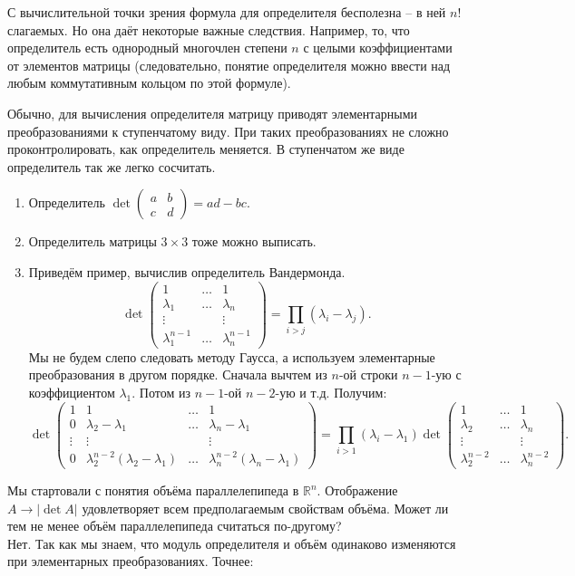 \documentclass[10pt,a4paper,oneside]{book}
\theoremstyle{definition}
\newcommand{\mb}[1]{\mathbb{#1}}
\def\exm{\noindent {\bf Примеры:}}
\def\enm{\begin{enumerate}}
\def\eenm{\end{enumerate}}
\def\pmat{\begin{pmatrix}}
\def\epmat{\end{pmatrix}}
\begin{document}
С вычислительной точки зрения формула для определителя бесполезна -- в ней $n!$ слагаемых. Но она даёт некоторые важные следствия. Например, то, что определитель есть однородный многочлен степени $n$ с целыми коэффициентами от элементов матрицы (следовательно, понятие определителя можно ввести над любым коммутативным кольцом по этой формуле).

Обычно, для вычисления определителя матрицу приводят элементарными преобразованиями к ступенчатому виду. При таких преобразованиях не сложно проконтролировать, как определитель меняется. В ступенчатом же виде определитель так же легко сосчитать.



\exm
\enm 
\item Определитель  $\det \left(\begin{smallmatrix} a&b \\ c& d\end{smallmatrix}\right)=ad-bc$.
\item Определитель матрицы $3\times 3$ тоже можно выписать. 
\item Приведём пример, вычислив определитель Вандермонда.
$$\det \pmat 1 & \dots & 1\\
\lambda_1 & \dots & \lambda_n\\
\vdots &&\vdots\\
\lambda_1^{n-1}& \dots & \lambda_n^{n-1} \epmat= \prod_{i>j}(\lambda_i-\lambda_j).$$
Мы не будем слепо следовать методу Гаусса, а используем элементарные преобразования в другом порядке. Сначала вычтем из $n$-ой строки $n-1$-ую с коэффициентом $\lambda_1$. Потом из $n-1$-ой $n-2$-ую и т.д. Получим:
$$\det \pmat 1 & 1& \dots & 1\\
0 & \lambda_2-\lambda_1 & \dots & \lambda_n-\lambda_1\\
\vdots& \vdots &&\vdots\\
0& \lambda_2^{n-2}(\lambda_2-\lambda_1)& \dots & \lambda_n^{n-2}(\lambda_n-\lambda_1) \epmat= \prod_{i>1}(\lambda_i-\lambda_1)\det \pmat 1 & \dots & 1\\
\lambda_2 & \dots & \lambda_n\\
\vdots &&\vdots\\
\lambda_2^{n-2}& \dots & \lambda_n^{n-2} \epmat.$$
\eenm

Мы стартовали с понятия объёма параллелепипеда в $\mb R^n$. Отображение $A \to |\det A|$ удовлетворяет всем предполагаемым свойствам объёма. Может ли тем не менее объём параллелепипеда считаться по-другому? \\
Нет. Так как мы знаем, что модуль определителя и объём одинаково изменяются при элементарных преобразованиях. Точнее:
\end{document}
